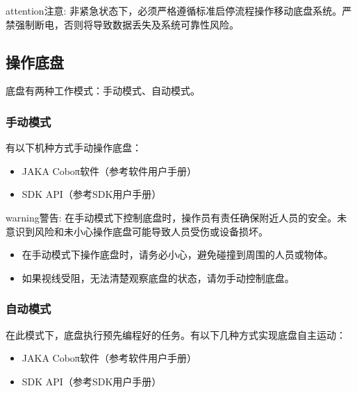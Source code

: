\documentclass[a4paper,11pt,english,openany,oneside]{sphinxmanual}
\begin{document}
\begin{sphinxadmonition}{attention}{注意:}
\sphinxAtStartPar
非紧急状态下，必须严格遵循标准启停流程操作移动底盘系统。严禁强制断电，否则将导致数据丢失及系统可靠性风险。
\end{sphinxadmonition}


\subsection{操作底盘}
\label{\detokenize{08 _u5b89_u88c5_u4e0e_u8c03_u8bd5:id43}}\label{\detokenize{08 _u5b89_u88c5_u4e0e_u8c03_u8bd5:id44}}
\sphinxAtStartPar
底盘有两种工作模式：手动模式、自动模式。


\subsubsection{手动模式}
\label{\detokenize{08 _u5b89_u88c5_u4e0e_u8c03_u8bd5:id45}}\label{\detokenize{08 _u5b89_u88c5_u4e0e_u8c03_u8bd5:id46}}
\sphinxAtStartPar
有以下机种方式手动操作底盘：
\begin{itemize}
\item {} 
\sphinxAtStartPar
JAKA Coboπ软件（参考软件用户手册）

\item {} 
\sphinxAtStartPar
SDK API（参考SDK用户手册）

\end{itemize}

\begin{sphinxadmonition}{warning}{警告:}
\sphinxAtStartPar
在手动模式下控制底盘时，操作员有责任确保附近人员的安全。未意识到风险和未小心操作底盘可能导致人员受伤或设备损坏。
\begin{itemize}
\item {} 
\sphinxAtStartPar
在手动模式下操作底盘时，请务必小心，避免碰撞到周围的人员或物体。

\item {} 
\sphinxAtStartPar
如果视线受阻，无法清楚观察底盘的状态，请勿手动控制底盘。

\end{itemize}
\end{sphinxadmonition}


\subsubsection{自动模式}
\label{\detokenize{08 _u5b89_u88c5_u4e0e_u8c03_u8bd5:id47}}\label{\detokenize{08 _u5b89_u88c5_u4e0e_u8c03_u8bd5:id48}}
\sphinxAtStartPar
在此模式下，底盘执行预先编程好的任务。有以下几种方式实现底盘自主运动：
\begin{itemize}
\item {} 
\sphinxAtStartPar
JAKA Coboπ软件（参考软件用户手册）

\item {} 
\sphinxAtStartPar
SDK API（参考SDK用户手册）

\end{itemize}
\end{document}
